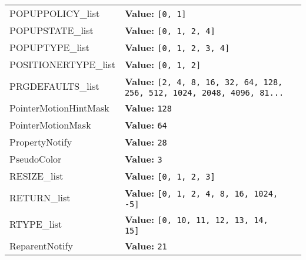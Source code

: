 \begin{longtable}{|p{\varnamewidth}|p{\vardescrwidth}|l}
\cline{1-2}
\raggedright P\-O\-P\-U\-P\-P\-O\-L\-I\-C\-Y\-\_\-l\-i\-s\-t\- & \raggedright \textbf{Value:} 
{\tt \texttt{[}0\texttt{, }1\texttt{]}}&\\
\cline{1-2}
\raggedright P\-O\-P\-U\-P\-S\-T\-A\-T\-E\-\_\-l\-i\-s\-t\- & \raggedright \textbf{Value:} 
{\tt \texttt{[}0\texttt{, }1\texttt{, }2\texttt{, }4\texttt{]}}&\\
\cline{1-2}
\raggedright P\-O\-P\-U\-P\-T\-Y\-P\-E\-\_\-l\-i\-s\-t\- & \raggedright \textbf{Value:} 
{\tt \texttt{[}0\texttt{, }1\texttt{, }2\texttt{, }3\texttt{, }4\texttt{]}}&\\
\cline{1-2}
\raggedright P\-O\-S\-I\-T\-I\-O\-N\-E\-R\-T\-Y\-P\-E\-\_\-l\-i\-s\-t\- & \raggedright \textbf{Value:} 
{\tt \texttt{[}0\texttt{, }1\texttt{, }2\texttt{]}}&\\
\cline{1-2}
\raggedright P\-R\-G\-D\-E\-F\-A\-U\-L\-T\-S\-\_\-l\-i\-s\-t\- & \raggedright \textbf{Value:} 
{\tt \texttt{[}2\texttt{, }4\texttt{, }8\texttt{, }16\texttt{, }32\texttt{, }64\texttt{, }128\texttt{, }256\texttt{, }512\texttt{, }1024\texttt{, }2048\texttt{, }4096\texttt{, }81\texttt{...}}&\\
\cline{1-2}
\raggedright P\-o\-i\-n\-t\-e\-r\-M\-o\-t\-i\-o\-n\-H\-i\-n\-t\-M\-a\-s\-k\- & \raggedright \textbf{Value:} 
{\tt 128}&\\
\cline{1-2}
\raggedright P\-o\-i\-n\-t\-e\-r\-M\-o\-t\-i\-o\-n\-M\-a\-s\-k\- & \raggedright \textbf{Value:} 
{\tt 64}&\\
\cline{1-2}
\raggedright P\-r\-o\-p\-e\-r\-t\-y\-N\-o\-t\-i\-f\-y\- & \raggedright \textbf{Value:} 
{\tt 28}&\\
\cline{1-2}
\raggedright P\-s\-e\-u\-d\-o\-C\-o\-l\-o\-r\- & \raggedright \textbf{Value:} 
{\tt 3}&\\
\cline{1-2}
\raggedright R\-E\-S\-I\-Z\-E\-\_\-l\-i\-s\-t\- & \raggedright \textbf{Value:} 
{\tt \texttt{[}0\texttt{, }1\texttt{, }2\texttt{, }3\texttt{]}}&\\
\cline{1-2}
\raggedright R\-E\-T\-U\-R\-N\-\_\-l\-i\-s\-t\- & \raggedright \textbf{Value:} 
{\tt \texttt{[}0\texttt{, }1\texttt{, }2\texttt{, }4\texttt{, }8\texttt{, }16\texttt{, }1024\texttt{, }-5\texttt{]}}&\\
\cline{1-2}
\raggedright R\-T\-Y\-P\-E\-\_\-l\-i\-s\-t\- & \raggedright \textbf{Value:} 
{\tt \texttt{[}0\texttt{, }10\texttt{, }11\texttt{, }12\texttt{, }13\texttt{, }14\texttt{, }15\texttt{]}}&\\
\cline{1-2}
\raggedright R\-e\-p\-a\-r\-e\-n\-t\-N\-o\-t\-i\-f\-y\- & \raggedright \textbf{Value:} 
{\tt 21}&\\

\end{longtable}
